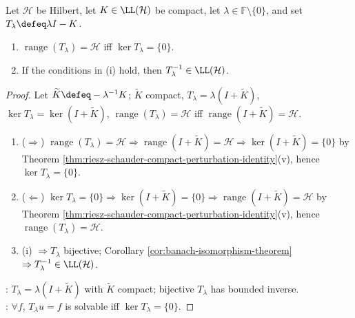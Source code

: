\begin{corollary} \label{cor:fredholm-alternative-compact-operator} \\
Let $\mathcal{H}$ be Hilbert, let $K\in\LL(\mathcal{H})$ be compact, let $\lambda\in\mathbb{F}\setminus\{0\}$, and set $T_\lambda\defeq\lambda I-K$.
\begin{enumerate}[label=(\roman*)]
\setlength{\itemsep}{0pt}
\item $\operatorname{range}(T_\lambda)=\mathcal{H}$ iff $\ker T_\lambda=\{0\}$.
\item If the conditions in (i) hold, then $T_\lambda^{-1}\in\LL(\mathcal{H})$.
\end{enumerate}
\begin{proof} Let $\widetilde K\defeq-\lambda^{-1}K$; $\widetilde K$ compact, $T_\lambda=\lambda(I+\widetilde K)$, $\ker T_\lambda=\ker(I+\widetilde K)$, $\operatorname{range}(T_\lambda)=\mathcal{H}$ iff $\operatorname{range}(I+\widetilde K)=\mathcal{H}$.
\begin{enumerate}[label=(\roman*)]
\setlength{\itemsep}{0pt}
\item[$(i)$] ($\Rightarrow$) $\operatorname{range}(T_\lambda)=\mathcal{H}\Rightarrow\operatorname{range}(I+\widetilde K)=\mathcal{H}\Rightarrow\ker(I+\widetilde K)=\{0\}$ by Theorem \ref{thm:riesz-schauder-compact-perturbation-identity}(v), hence $\ker T_\lambda=\{0\}$.
\item[$(i)$] ($\Leftarrow$) $\ker T_\lambda=\{0\}\Rightarrow\ker(I+\widetilde K)=\{0\}\Rightarrow\operatorname{range}(I+\widetilde K)=\mathcal{H}$ by Theorem \ref{thm:riesz-schauder-compact-perturbation-identity}(v), hence $\operatorname{range}(T_\lambda)=\mathcal{H}$.
\item[$(ii)$] (i) $\Rightarrow T_\lambda$ bijective; Corollary \ref{cor:banach-isomorphism-theorem} $\Rightarrow T_\lambda^{-1}\in\LL(\mathcal{H})$.
\end{enumerate}
: $T_\lambda=\lambda(I+\widetilde K)$ with $\widetilde K$ compact; bijective $T_\lambda$ has bounded inverse.\\
: $\forall f$, $T_\lambda u=f$ is solvable iff $\ker T_\lambda=\{0\}$.
\end{proof}
\end{corollary}

